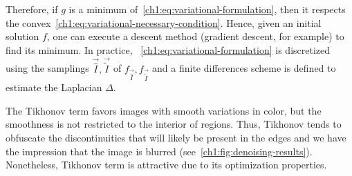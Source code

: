 Therefore, if $g$ is a minimum of~\cref{ch1:eq:variational-formulation}, then it respects the convex~\cref{ch1:eq:variational-necessary-condition}. Hence, given an initial solution $f$, one can execute a descent method (gradient descent, for example) to find its minimum. In practice, ~\cref{ch1:eq:variational-formulation} is discretized using the samplings $\vec{\widehat{I}}, \vec{\widetilde{I}}$ of $f_{\vec{\widehat{I}}},f_{\vec{\widetilde{I}}}$ and a finite differences scheme is defined to estimate the Laplacian $\Delta$.

The Tikhonov term favors images with smooth variations in color, but the smoothness is not restricted to the interior of regions. Thus, Tikhonov tends to obfuscate the discontinuities that will likely be present in the edges and we have the impression that the image is blurred (see~\cref{ch1:fig:denoising-results}). Nonetheless, Tikhonov term is attractive due to its optimization properties.

